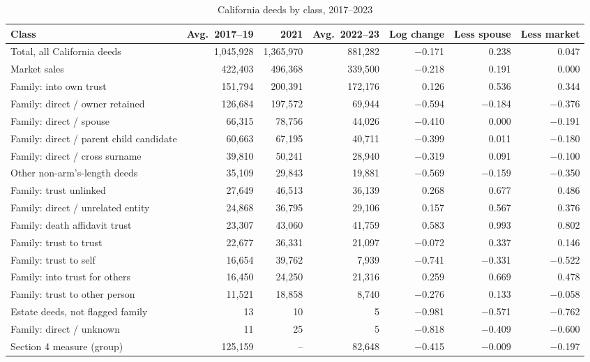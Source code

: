 \begin{table}[!ht]\centering
\caption{California deeds by class, 2017--2023}
\label{tab:s4classes}
{\small
\begin{adjustbox}{max width = \textwidth}
\begin{tabular}{lrrrrrr}
\toprule
Class & Avg.\ 2017--19 & 2021 & Avg.\ 2022--23 & Log change & Less spouse & Less market \\
\midrule
Total, all California deeds & 1,045,928 & 1,365,970 & 881,282 & $-$0.171 & 0.238 & 0.047 \\
Market sales & 422,403 & 496,368 & 339,500 & $-$0.218 & 0.191 & 0.000 \\
Family: into own trust & 151,794 & 200,391 & 172,176 & 0.126 & 0.536 & 0.344 \\
Family: direct / owner retained & 126,684 & 197,572 & 69,944 & $-$0.594 & $-$0.184 & $-$0.376 \\
Family: direct / spouse & 66,315 & 78,756 & 44,026 & $-$0.410 & 0.000 & $-$0.191 \\
Family: direct / parent child candidate & 60,663 & 67,195 & 40,711 & $-$0.399 & 0.011 & $-$0.180 \\
Family: direct / cross surname & 39,810 & 50,241 & 28,940 & $-$0.319 & 0.091 & $-$0.100 \\
Other non-arm's-length deeds & 35,109 & 29,843 & 19,881 & $-$0.569 & $-$0.159 & $-$0.350 \\
Family: trust unlinked & 27,649 & 46,513 & 36,139 & 0.268 & 0.677 & 0.486 \\
Family: direct / unrelated entity & 24,868 & 36,795 & 29,106 & 0.157 & 0.567 & 0.376 \\
Family: death affidavit trust & 23,307 & 43,060 & 41,759 & 0.583 & 0.993 & 0.802 \\
Family: trust to trust & 22,677 & 36,331 & 21,097 & $-$0.072 & 0.337 & 0.146 \\
Family: trust to self & 16,654 & 39,762 & 7,939 & $-$0.741 & $-$0.331 & $-$0.522 \\
Family: into trust for others & 16,450 & 24,250 & 21,316 & 0.259 & 0.669 & 0.478 \\
Family: trust to other person & 11,521 & 18,858 & 8,740 & $-$0.276 & 0.133 & $-$0.058 \\
Estate deeds, not flagged family & 13 & 10 & 5 & $-$0.981 & $-$0.571 & $-$0.762 \\
Family: direct / unknown & 11 & 25 & 5 & $-$0.818 & $-$0.409 & $-$0.600 \\
Section 4 measure (group) & 125,159 & -- & 82,648 & $-$0.415 & $-$0.009 & $-$0.197 \\

\end{tabular}
\end{adjustbox}}
\end{table}
